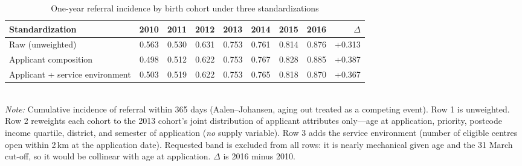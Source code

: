 \begin{table}[htbp]\centering
\caption{One-year referral incidence by birth cohort under three standardizations}
\label{tab:P3series}
\footnotesize
\setlength{\tabcolsep}{4pt}
\begin{tabular}{lrrrrrrrr}
\toprule
Standardization & 2010 & 2011 & 2012 & 2013 & 2014 & 2015 & 2016 & $\Delta$ \\
\midrule
Raw (unweighted) & 0.563 & 0.530 & 0.631 & 0.753 & 0.761 & 0.814 & 0.876 & +0.313 \\
Applicant composition & 0.498 & 0.512 & 0.622 & 0.753 & 0.767 & 0.828 & 0.885 & +0.387 \\
Applicant + service environment & 0.503 & 0.519 & 0.622 & 0.753 & 0.765 & 0.818 & 0.870 & +0.367 \\
\bottomrule
\end{tabular}
\\[3pt]{\footnotesize \textit{Note:} Cumulative incidence of referral within 365 days (Aalen--Johansen, aging out treated as a competing event). Row 1 is unweighted. Row 2 reweights each cohort to the 2013 cohort's joint distribution of applicant attributes only---age at application, priority, postcode income quartile, district, and semester of application (\emph{no} supply variable). Row 3 adds the service environment (number of eligible centres open within 2\,km at the application date). Requested band is excluded from all rows: it is nearly mechanical given age and the 31 March cut-off, so it would be collinear with age at application. $\Delta$ is 2016 minus 2010.}
\end{table}
